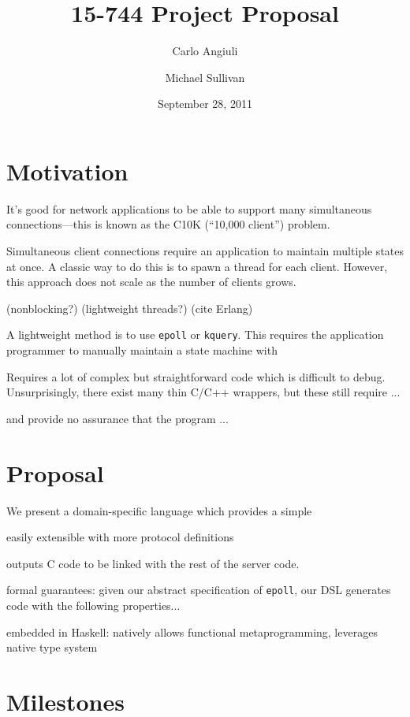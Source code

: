 \documentclass{article}
\title{15-744 Project Proposal}
\author{Carlo Angiuli \and Michael Sullivan}
\date{September 28, 2011}
\renewcommand{\t}{\texttt}
\begin{document}
\maketitle


\section{Motivation}

It's good for network applications to be able to support many simultaneous
connections---this is known as the C10K (``10,000 client'') problem\cite{c10k}. 

Simultaneous client connections require an application to maintain multiple
states at once. A classic way to do this is to spawn a thread for each client.
However, this approach does not scale as the number of clients grows. 

(nonblocking?)
(lightweight threads?)
(cite Erlang)

A lightweight method is to use \t{epoll} or \t{kquery}.
This requires the application programmer to manually maintain a state machine
with 

Requires a lot of complex but straightforward code which is difficult to debug.
Unsurprisingly, there exist many thin C/C++ wrappers, but these still require
...

and provide no assurance that the program ...

\section{Proposal}

We present a domain-specific language which provides a simple

easily extensible with more protocol definitions

outputs C code to be linked with the rest of the server code.

formal guarantees: given our abstract specification of \t{epoll}, our DSL
generates code with the following properties...

embedded in Haskell: natively allows functional metaprogramming,
leverages native type system

\section{Milestones}



{}

\end{document}
